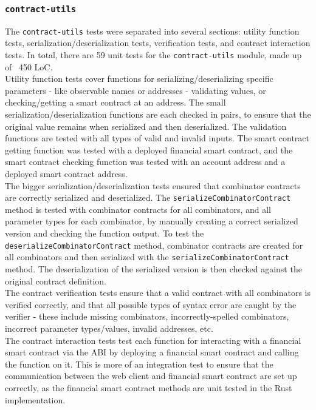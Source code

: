 \subsubsection{\texttt{contract-utils}}

The \texttt{contract-utils} tests were separated into several sections: utility function tests, serialization/deserialization tests, verification tests, and contract interaction tests. In total, there are 59 unit tests for the \texttt{contract-utils} module, made up of ~450 LoC. \\

Utility function tests cover functions for serializing/deserializing specific parameters - like observable names or addresses - validating values, or checking/getting a smart contract at an address. The small serialization/deserialization functions are each checked in pairs, to ensure that the original value remains when serialized and then deserialized. The validation functions are tested with all types of valid and invalid inputs. The smart contract getting function was tested with a deployed financial smart contract, and the smart contract checking function was tested with an account address and a deployed smart contract address. \\

The bigger serialization/deserialization tests ensured that combinator contracts are correctly serialized and deserialized. The \texttt{serializeCombinatorContract} method is tested with combinator contracts for all combinators, and all parameter types for each combinator, by manually creating a correct serialized version and checking the function output. To test the \texttt{deserializeCombinatorContract} method, combinator contracts are created for all combinators and then serialized with the \texttt{serializeCombinatorContract} method. The deserialization of the serialized version is then checked against the original contract definition. \\

The contract verification tests ensure that a valid contract with all combinators is verified correctly, and that all possible types of syntax error are caught by the verifier - these include missing combinators, incorrectly-spelled combinators, incorrect parameter types/values, invalid addresses, etc. \\

The contract interaction tests test each function for interacting with a financial smart contract via the ABI by deploying a financial smart contract and calling the function on it. This is more of an integration test to ensure that the communication between the web client and financial smart contract are set up correctly, as the financial smart contract methods are unit tested in the Rust implementation.


